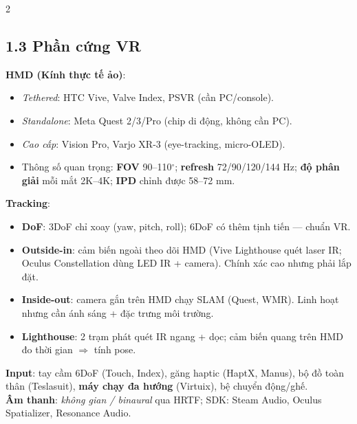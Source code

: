 \begin{paracol}{2}
\subsection*{1.3 Phần cứng VR}
\textbf{HMD (Kính thực tế ảo)}:
\begin{itemize}[leftmargin=*,nosep]
  \item \emph{Tethered}: HTC Vive, Valve Index, PSVR (cần PC/console).
  \item \emph{Standalone}: Meta Quest 2/3/Pro (chip di động, không cần PC).
  \item \emph{Cao cấp}: Vision Pro, Varjo XR-3 (eye-tracking, micro-OLED).
  \item Thông số quan trọng: \textbf{FOV} 90–110$^\circ$; \textbf{refresh} 72/90/120/144 Hz; \textbf{độ phân giải} mỗi mắt 2K–4K; \textbf{IPD} chỉnh được 58–72 mm.
\end{itemize}
\textbf{Tracking}:
\begin{itemize}[leftmargin=*,nosep]
  \item \textbf{DoF}: 3DoF chỉ xoay (yaw, pitch, roll); 6DoF có thêm tịnh tiến — chuẩn VR.
  \item \textbf{Outside-in}: cảm biến ngoài theo dõi HMD (Vive Lighthouse quét laser IR; Oculus Constellation dùng LED IR + camera). Chính xác cao nhưng phải lắp đặt.
  \item \textbf{Inside-out}: camera gắn trên HMD chạy SLAM (Quest, WMR). Linh hoạt nhưng cần ánh sáng + đặc trưng môi trường.
  \item \textbf{Lighthouse}: 2 trạm phát quét IR ngang + dọc; cảm biến quang trên HMD đo thời gian $\Rightarrow$ tính pose.
\end{itemize}
\textbf{Input}: tay cầm 6DoF (Touch, Index), găng haptic (HaptX, Manus), bộ đồ toàn thân (Teslasuit), \textbf{máy chạy đa hướng} (Virtuix), bệ chuyển động/ghế.\\
\textbf{Âm thanh}: \emph{không gian / binaural} qua HRTF; SDK: Steam Audio, Oculus Spatializer, Resonance Audio.

\switchcolumn*


\end{paracol}
